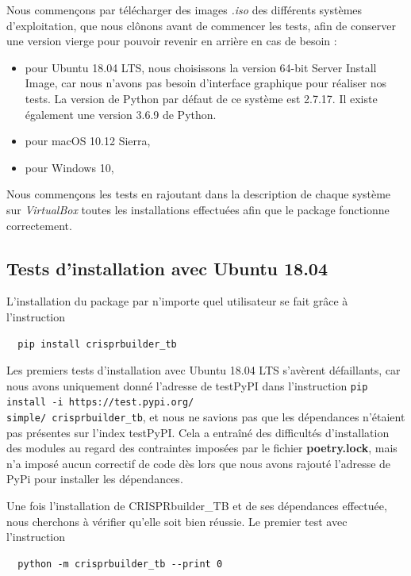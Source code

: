 \documentclass[twoside,a4paper,11pt,frenchb,openany]{report}
\begin{document}
Nous commençons par télécharger des images \textit{.iso} des différents systèmes d'exploitation, que nous clônons avant de commencer les tests, afin de conserver une version vierge pour pouvoir revenir en arrière en cas de besoin :
\begin{itemize}
\item pour Ubuntu 18.04 LTS, nous choisissons la version 64-bit Server Install Image, car nous n'avons pas besoin d'interface graphique pour réaliser nos tests. La version de Python par défaut de ce système est 2.7.17. Il existe également une version 3.6.9 de Python.
\item pour macOS 10.12 Sierra, 
\item pour Windows 10, 
\end{itemize}

Nous commençons les tests en rajoutant dans la description de chaque système sur \textit{VirtualBox} toutes les installations effectuées afin que le package fonctionne correctement.





\subsection{Tests d'installation avec Ubuntu 18.04}

L’installation du package par n'importe quel utilisateur se fait grâce à l’instruction
\begin{verbatim}  pip install crisprbuilder_tb\end{verbatim}

Les premiers tests d'installation avec Ubuntu 18.04 LTS s'avèrent défaillants, car nous avons uniquement donné l'adresse de testPyPI dans l'instruction \texttt{pip install -i https://test.pypi.org/\\simple/ crisprbuilder\_tb}, et nous ne savions pas que les dépendances n'étaient pas présentes sur l'index testPyPI. Cela a entraîné des difficultés d'installation des modules au regard des contraintes imposées par le fichier \textbf{poetry.lock}, mais n'a imposé aucun correctif de code dès lors que nous avons rajouté l'adresse de PyPi pour installer les dépendances.

Une fois l'installation de CRISPRbuilder\_TB et de ses dépendances effectuée, nous cherchons à vérifier qu'elle soit bien réussie. Le premier test avec l'instruction

\begin{verbatim}
  python -m crisprbuilder_tb --print 0
\end{verbatim}
\end{document}

